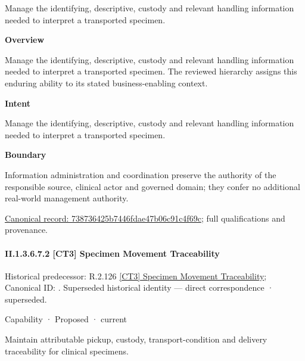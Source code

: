 Manage the identifying, descriptive, custody and relevant handling information needed to interpret a transported specimen.



\textbf{Overview}



Manage the identifying, descriptive, custody and relevant handling information needed to interpret a transported specimen. The reviewed hierarchy assigns this enduring ability to its stated business-enabling context.



\textbf{Intent}



Manage the identifying, descriptive, custody and relevant handling information needed to interpret a transported specimen.



\textbf{Boundary}



Information administration and coordination preserve the authority of the responsible source, clinical actor and governed domain; they confer no additional real-world management authority.


{\footnotesize \href{../../../../continuum/strategy/capability/738736425b7446fdae47b06c91c4f69c.md}{Canonical record: 738736425b7446fdae47b06c91c4f69c}; full qualifications and provenance.}\par
\paragraph*{II.1.3.6.7.2 [CT3] Specimen Movement Traceability}
\label{navigation:II.1.3.6.7.2}

{\small Historical predecessor: R.2.126 \hyperref[element:129119d7b2744ffd805c58f25557fa27]{[CT3] Specimen Movement Traceability}; Canonical ID: \texttt{}. Superseded historical identity — direct correspondence · superseded.}\par
\label{element:bfa2e9a84ddd4287897573dc0d917a00}
{\small Capability · Proposed · current}\par

Maintain attributable pickup, custody, transport-condition and delivery traceability for clinical specimens.



